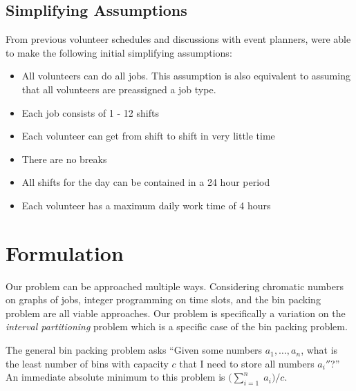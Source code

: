 \documentclass[11pt]{article}
\theoremstyle{definition}
\begin{document}
\begin{multicols}{2}
\subsection{Simplifying Assumptions}
From previous volunteer schedules and discussions with event planners, were able to make the following initial simplifying assumptions:
\begin{itemize}\itemsep0pt
\item All volunteers can do all jobs. This assumption is also equivalent to assuming that all volunteers are preassigned a job type.
\item Each job consists of 1 - 12 shifts
\item Each volunteer can get from shift to shift in very little time
\item There are no breaks
\item All shifts for the day can be contained in a 24 hour period
\item Each volunteer has a maximum daily work time of 4 hours
\end{itemize}
%
%
\section{Formulation}
Our problem can be approached multiple ways.
Considering chromatic numbers on graphs of jobs, integer programming on time slots, and the bin packing problem are all viable approaches.
Our problem is specifically a variation on the \textit{interval partitioning} problem which is a specific case of the bin packing problem.

The general bin packing problem asks ``Given some numbers $a_1, \ldots, a_n$, what is the least number of bins with capacity $c$ that I need to store all numbers $a_i''$?''
An immediate absolute minimum to this problem is $\big(\sum_{i = 1}^{n}\;a_i\big)/c$.


\end{multicols}
\end{document}
